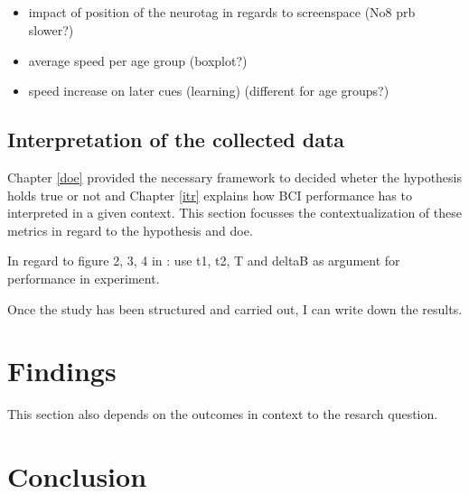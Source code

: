         \section*{}

            \begin{itemize}
                    \item impact of position of the neurotag in regards to screenspace (No8 prb slower?)
                    \item average speed per age group (boxplot?)
                    \item speed increase on later cues (learning) (different for age groups?)
            \end{itemize}


        \section{Interpretation of the collected data}\label{operationalization}

            Chapter \ref*{doe} provided the necessary framework to decided wheter the hypothesis holds true or not and Chapter \ref*{itr} explains how BCI performance has to interpreted in a given context. This section focusses the contextualization of these metrics in regard to the hypothesis and doe.

            \medskip


            In regard to figure 2, 3, 4 in \cite{Yuan.2013}: use t1, t2, T and deltaB as argument for performance in experiment.    

                Once the study has been structured and carried out, I can write down the results.

    \chapter{Findings}

        This section also depends on the outcomes in context to the resarch question.

    \chapter{Conclusion}

